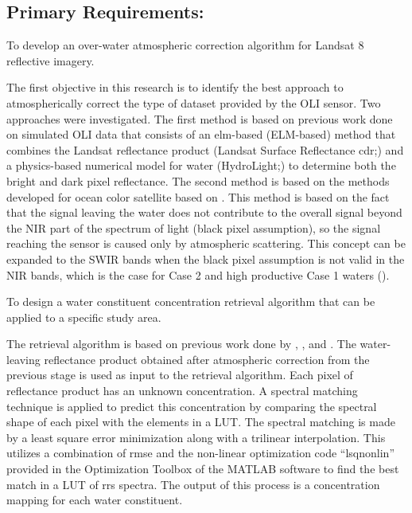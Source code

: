 \subsection{Primary Requirements:}
\begin{enumerate} 
	{\bf \item To develop an over-water atmospheric correction algorithm for Landsat 8 reflective imagery.} 

The first objective in this research is to identify the best approach to atmospherically correct the type of dataset provided by the OLI sensor. Two approaches were investigated. The first method is based on previous work done on simulated OLI data \cite{Gerace:2013,Gerace:2012,GeraceThesis,Pahlevan:2012} that consists of an \acrfull{elm}-based (ELM-based) method that combines the Landsat reflectance product (Landsat Surface Reflectance \acrshort{cdr};\cite{LandsatCDR}) and a physics-based numerical model for water (HydroLight;\cite{MobleyHEtech}) to determine both the bright and dark pixel reflectance. The second method is based on the methods developed for ocean color satellite based on \cite{Gordon:1994}. This method is based on the fact that the signal leaving the water does not contribute to the overall signal beyond the NIR part of the spectrum of light (black pixel assumption), so the signal reaching the sensor is caused only by atmospheric scattering. This concept can be expanded to the SWIR bands when the black pixel assumption is not valid in the NIR bands, which is the case for Case 2 and high productive Case 1 waters (\cite{Wang:2007}).

	{\bf \item To design a water constituent concentration retrieval algorithm that can be applied to a specific study area.}

The retrieval algorithm is based on previous work done by \cite{Raqueno:2003}, \cite{GeraceThesis}, and \cite{Pahlevan:2012}. The water-leaving reflectance product obtained after atmospheric correction from the previous stage is used as input to the retrieval algorithm. Each pixel of reflectance product has an unknown concentration. A spectral matching technique is applied to predict this concentration by comparing the spectral shape of each pixel with the elements in a LUT. The spectral matching is made by a least square error minimization along with a trilinear interpolation. This utilizes a combination of \acrfull{rmse} and the non-linear optimization code ``lsqnonlin'' provided in the Optimization Toolbox of the MATLAB software \cite{MatlabHelp} to find the best match in a LUT of \gls{rrs} spectra. The output of this process is a concentration mapping for each water constituent.


\end{enumerate}
